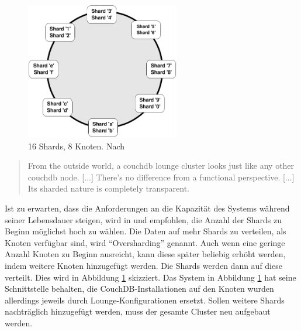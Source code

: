 \medskip
\begin{figure}[H] 
  \begin{center}
    \includegraphics[width=0.6\textwidth]{grafik/shards1} 
  \end{center}
  \caption[16 Shards, 8 Knoten]{16 Shards, 8 Knoten. Nach }
  \label{fig:lounge-scaling1} 
\end{figure}

\begin{quote}
From the outside world, a couchdb lounge cluster looks just like any other couchdb node. [...] There's no difference from a functional perspective. [...] Its sharded nature is completely transparent. \cite{lounge:blogpost}
\end{quote}

Ist zu erwarten, dass die Anforderungen an die Kapazität des Systems während seiner Lebensdauer steigen, wird in  und \cite{lounge:till} empfohlen, die Anzahl der Shards zu Beginn möglichst hoch zu wählen. Die Daten auf mehr Shards zu verteilen, als Knoten verfügbar sind, wird \enquote{Oversharding} genannt. Auch wenn eine geringe Anzahl Knoten zu Beginn ausreicht, kann diese später beliebig erhöht werden, indem weitere Knoten hinzugefügt werden. Die Shards werden dann auf diese verteilt. Dies wird in Abbildung \ref{fig:lounge-scaling1} skizziert. Das System in Abbildung \ref{fig:lounge-scaling1} hat seine Schnittstelle behalten, die CouchDB-Installationen auf den Knoten wurden allerdings jeweils durch Lounge-Konfigurationen ersetzt. Sollen weitere Shards nachträglich hinzugefügt werden, muss der gesamte Cluster neu aufgebaut werden.

